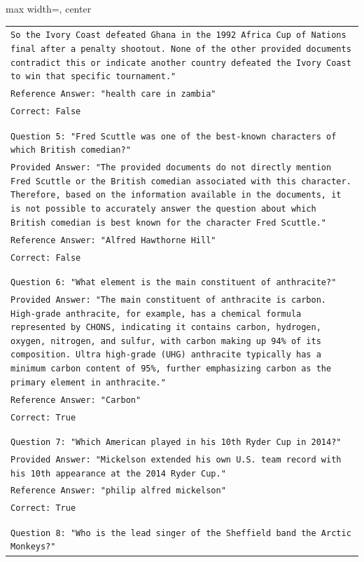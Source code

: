\documentclass[11pt]{article}
\begin{document}
\begin{table}[ht]
\begin{adjustbox}{max width=\textwidth, center}
\begin{tabular}{>{\raggedright\arraybackslash\tt}p{}<{}}
\\
So the Ivory Coast defeated Ghana in the 1992 Africa Cup of Nations final after a penalty shootout. None of the other provided documents contradict this or indicate another country defeated the Ivory Coast to win that specific tournament."\\
Reference Answer: "health care in zambia"\\
Correct: False\\
\\
\\
Question 5: "Fred Scuttle was one of the best-known characters of which British comedian?"\\
Provided Answer: "The provided documents do not directly mention Fred Scuttle or the British comedian associated with this character. Therefore, based on the information available in the documents, it is not possible to accurately answer the question about which British comedian is best known for the character Fred Scuttle."\\
Reference Answer: "Alfred Hawthorne Hill"\\
Correct: False\\
\\
\\
Question 6: "What element is the main constituent of anthracite?"\\
Provided Answer: "The main constituent of anthracite is carbon. High-grade anthracite, for example, has a chemical formula represented by CHONS, indicating it contains carbon, hydrogen, oxygen, nitrogen, and sulfur, with carbon making up 94\% of its composition. Ultra high-grade (UHG) anthracite typically has a minimum carbon content of 95\%, further emphasizing carbon as the primary element in anthracite."\\
Reference Answer: "Carbon"\\
Correct: True\\
\\
\\
Question 7: "Which American played in his 10th Ryder Cup in 2014?"\\
Provided Answer: "Mickelson extended his own U.S. team record with his 10th appearance at the 2014 Ryder Cup."\\
Reference Answer: "philip alfred mickelson"\\
Correct: True\\
\\
\\
Question 8: "Who is the lead singer of the Sheffield band the Arctic Monkeys?"\\

\end{tabular}
\end{adjustbox}
\end{table}
\end{document}
